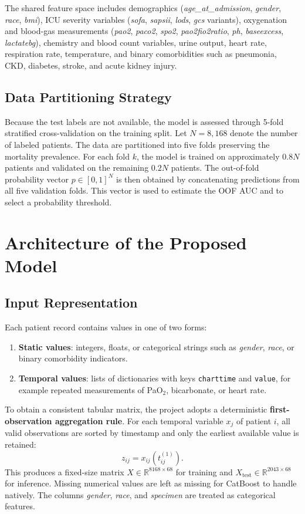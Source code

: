 \documentclass[a4paper,12pt]{extreport}
\begin{document}
The shared feature space includes demographics (\textit{age\_at\_admission}, \textit{gender}, \textit{race}, \textit{bmi}), ICU severity variables (\textit{sofa}, \textit{sapsii}, \textit{lods}, \textit{gcs} variants), oxygenation and blood-gas measurements (\textit{pao2}, \textit{paco2}, \textit{spo2}, \textit{pao2fio2ratio}, \textit{ph}, \textit{baseexcess}, \textit{lactatebg}), chemistry and blood count variables, urine output, heart rate, respiration rate, temperature, and binary comorbidities such as pneumonia, CKD, diabetes, stroke, and acute kidney injury.

\subsection{Data Partitioning Strategy}
Because the test labels are not available, the model is assessed through 5-fold stratified cross-validation on the training split. Let \(N=8{,}168\) denote the number of labeled patients. The data are partitioned into five folds preserving the mortality prevalence. For each fold \(k\), the model is trained on approximately \(0.8N\) patients and validated on the remaining \(0.2N\) patients. The out-of-fold probability vector \(p \in [0,1]^N\) is then obtained by concatenating predictions from all five validation folds. This vector is used to estimate the OOF AUC and to select a probability threshold.

\section{Architecture of the Proposed Model}

\subsection{Input Representation}
Each patient record contains values in one of two forms:
\begin{enumerate}[leftmargin=1.7em]
    \item \textbf{Static values}: integers, floats, or categorical strings such as \textit{gender}, \textit{race}, or binary comorbidity indicators.
    \item \textbf{Temporal values}: lists of dictionaries with keys \texttt{charttime} and \texttt{value}, for example repeated measurements of PaO\(_2\), bicarbonate, or heart rate.
\end{enumerate}

To obtain a consistent tabular matrix, the project adopts a deterministic \textbf{first-observation aggregation rule}. For each temporal variable \(x_j\) of patient \(i\), all valid observations are sorted by timestamp and only the earliest available value is retained:
\[
z_{ij} = x_{ij}\left(t_{ij}^{(1)}\right).
\]
This produces a fixed-size matrix \(X \in \mathbb{R}^{8168 \times 68}\) for training and \(X_{\text{test}} \in \mathbb{R}^{2043 \times 68}\) for inference. Missing numerical values are left as missing for CatBoost to handle natively. The columns \textit{gender}, \textit{race}, and \textit{specimen} are treated as categorical features.
\end{document}
